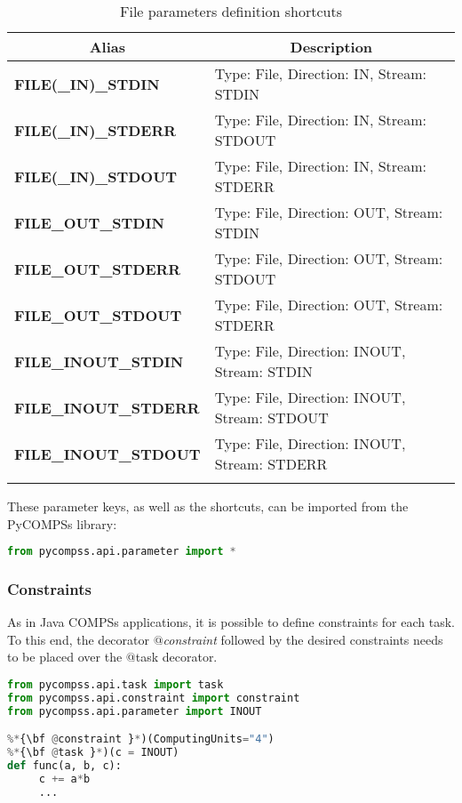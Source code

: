 \bgroup
  \def\arraystretch{1.5}%
  \begin{longtable}{| p{} | p{} |}
    \hline
    \multicolumn{1}{|c|}{{\bf Alias }} &  \multicolumn{1}{c|}{{\bf Description }}\\
    \hline
        \multirow{1}{*}{{\bf FILE(\_IN)\_STDIN}}  & Type: File, Direction: IN, Stream: STDIN \\
        \multirow{1}{*}{{\bf FILE(\_IN)\_STDERR}} & Type: File, Direction: IN, Stream: STDOUT \\
        \multirow{1}{*}{{\bf FILE(\_IN)\_STDOUT}} & Type: File, Direction: IN, Stream: STDERR \\
        \multirow{1}{*}{{\bf FILE\_OUT\_STDIN}}  & Type: File, Direction: OUT, Stream: STDIN \\
        \multirow{1}{*}{{\bf FILE\_OUT\_STDERR}} & Type: File, Direction: OUT, Stream: STDOUT \\
        \multirow{1}{*}{{\bf FILE\_OUT\_STDOUT}} & Type: File, Direction: OUT, Stream: STDERR \\
        \multirow{1}{*}{{\bf FILE\_INOUT\_STDIN}}  & Type: File, Direction: INOUT, Stream: STDIN \\
        \multirow{1}{*}{{\bf FILE\_INOUT\_STDERR}} & Type: File, Direction: INOUT, Stream: STDOUT \\
        \multirow{1}{*}{{\bf FILE\_INOUT\_STDOUT}} & Type: File, Direction: INOUT, Stream: STDERR \\
    \hline
     \caption{File parameters definition shortcuts}
    \label{tab:other_parameters_shortcuts}
  \end{longtable}
\egroup

These parameter keys, as well as the shortcuts, can be imported from the PyCOMPSs library:

\begin{lstlisting}[language=python]
from pycompss.api.parameter import *
\end{lstlisting}

\subsubsection{Constraints}
\label{subsubsec:constraints}

As in Java COMPSs applications, it is possible to define constraints for each task.
To this end, the decorator {\it $@$constraint} followed by the desired constraints needs to be placed over the $@$task decorator.

\begin{lstlisting}[language=python]
from pycompss.api.task import task
from pycompss.api.constraint import constraint
from pycompss.api.parameter import INOUT

%*{\bf @constraint }*)(ComputingUnits="4")
%*{\bf @task }*)(c = INOUT)
def func(a, b, c):
     c += a*b
     ...
\end{lstlisting}

